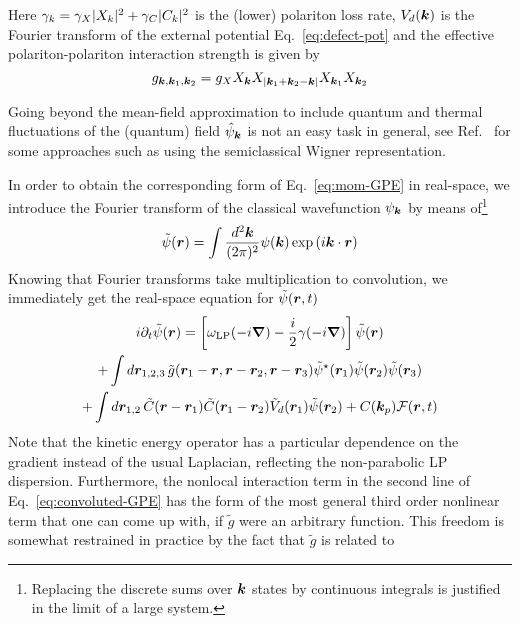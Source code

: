 Here $\gamma_k = \gamma_X \vert X_k \vert^2 + \gamma_C \vert C_k \vert^2$ is the
(lower) polariton loss rate, $V_d(\bm{k})$ is the Fourier transform of
the external potential Eq.~\eqref{eq:defect-pot} and the effective
polariton-polariton interaction strength is given by
%
\begin{equation}\label{eq:LP-inter}
  g_{\bm{k},\bm{k}_1,\bm{k}_2} = g_X X_{\bm{k}}X_{\vert\bm{k}_1 + \bm{k}_2 - \bm{k}\vert}X_{\bm{k}_1}X_{\bm{k}_2}
\end{equation}

Going beyond the mean-field approximation to include quantum and
thermal fluctuations of the (quantum) field $\hat{\psi}_{\bm{k}}$ is not
an easy task in general, see Ref.~\cite{Carusotto_2013} for some
approaches such as using the semiclassical Wigner representation.


In order to obtain the corresponding form of Eq.~\eqref{eq:mom-GPE} in
real-space, we introduce the Fourier transform of the classical
wavefunction $\psi_{\bm{k}}$ by means of\footnote{Replacing the discrete
  sums over $\bm{k}$ states by continuous integrals is justified in the
  limit of a large system.}
%
\begin{equation}\label{eq:fourier-psi}
  \tilde{\psi}(\bm{r}) = \int \frac{d^2\bm{k}}{(2\pi)^2} \psi(\bm{k}) \exp \left(i \bm{k} \cdot\bm{r} \right)
\end{equation}
% 
Knowing that Fourier transforms take multiplication to convolution, we
immediately get the real-space equation for $\tilde{\psi}(\bm{r}, t)$
\begin{multline}\label{eq:convoluted-GPE}
  i \partial_t \tilde{\psi}(\bm{r}) = \left[ \omega_{\text{LP}}(-i \bm{\nabla}) - \frac{i}{2} \gamma(-i \bm{\nabla}) \right] \tilde{\psi}(\bm{r})\\ + \int d\bm{r}_{1,2,3} \,\tilde{g}(\bm{r}_1 - \bm{r}, \bm{r} - \bm{r}_2, \bm{r} - \bm{r}_3) \tilde{\psi}^{\star}(\bm{r}_1) \tilde{\psi}(\bm{r}_2) \tilde{\psi}(\bm{r}_3)\\
+ \int d\bm{r}_{1,2} \,\tilde{C}(\bm{r} - \bm{r}_1) \tilde{C}(\bm{r}_1 - \bm{r}_2) \tilde{V}_d(\bm{r}_1) \tilde{\psi}(\bm{r}_2) + C(\bm{k}_p) \mathcal{F}(\bm{r},t)
\end{multline}
Note that the kinetic energy operator has a particular dependence on
the gradient instead of the usual Laplacian, reflecting the
non-parabolic LP dispersion.  Furthermore, the nonlocal interaction
term in the second line of Eq.~\eqref{eq:convoluted-GPE} has the form
of the most general third order nonlinear term that one can come up
with, if $\tilde{g}$ were an arbitrary function. This freedom is
somewhat restrained in practice by the fact that $\tilde{g}$ is related to
